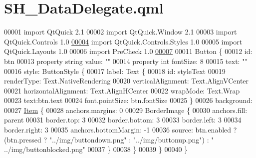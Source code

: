 \hypertarget{SH__DataDelegate_8qml}{\section{S\-H\-\_\-\-Data\-Delegate.\-qml}
\label{SH__DataDelegate_8qml}
}

\begin{DoxyCode}
00001 \textcolor{keyword}{import} QtQuick 2.1
00002 import QtQuick.Window 2.1
00003 import QtQuick.Controls 1.0
\hypertarget{SH__DataDelegate_8qml_source_l00004}{}\hyperlink{classSH__DataDelegate}{00004} import QtQuick.Controls.Styles 1.0
00005 import QtQuick.Layouts 1.0
00006 import PreCheck 1.0
\hypertarget{SH__DataDelegate_8qml_source_l00007}{}\hyperlink{classSH__DataDelegate_acb9da3c73493c88865e08d9575f26482}{00007} 
00011 Button \{
00012     \textcolor{keywordtype}{id}: btn
00013     \textcolor{keyword}{property} \textcolor{keywordtype}{string} value: \textcolor{stringliteral}{""}
00014     \textcolor{keyword}{property} \textcolor{keywordtype}{int} fontSize: 8
00015     text: \textcolor{stringliteral}{""}
00016     style: ButtonStyle \{
00017         label: Text \{
00018             \textcolor{keywordtype}{id}: styleText
00019             renderType: Text.NativeRendering
00020             verticalAlignment: Text.AlignVCenter
00021             horizontalAlignment: Text.AlignHCenter
00022             wrapMode: Text.Wrap
00023             text:btn.text
00024             font.pointSize: btn.fontSize
00025         \}
00026         background:
00027             \hyperlink{classItem}{Item} \{
00028             anchors.margins: 0
00029             BorderImage \{
00030                 anchors.fill: parent
00031                 border.top: 3
00032                 border.bottom: 3
00033                 border.left: 3
00034                 border.right: 3
00035                 anchors.bottomMargin: -1
00036                 source: btn.enabled ? (btn.pressed ? \textcolor{stringliteral}{"../img/buttondown.png"} : \textcolor{stringliteral}{"../img/buttonup.png"}) : \textcolor{stringliteral}{"
      ../img/buttonblocked.png"}
00037             \}
00038         \}
00039     \}
00040 \}
\end{DoxyCode}
